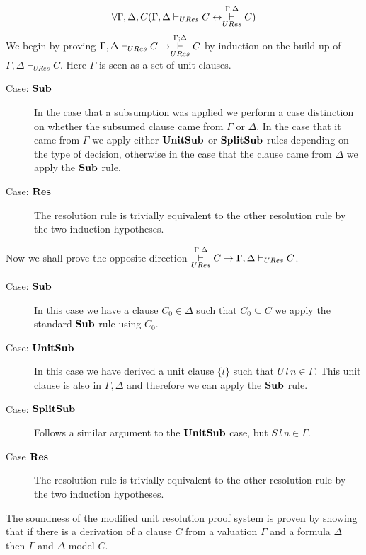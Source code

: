 \medskip
\begin{mytheorem}
\begin{align*}
\forall \Gamma,\Delta,C ( \Gamma,\Delta \vdash_{URes} C  \leftrightarrow   \overset{\Gamma;\Delta}{\underset{URes}{\vdash}} C )
\end{align*}
 We begin by proving $\Gamma,\Delta \vdash_{URes} C  \to   \overset{\Gamma;\Delta}{\underset{URes}{\vdash}} C$ by induction on the build up of $\Gamma, \Delta \vdash_{URes} C$. Here $\Gamma$ is seen as a set of unit clauses.
\begin{description}

\item[Case: $\mathbf{Sub}$]
In the case that a subsumption was applied we perform a case distinction on whether the subsumed clause came from $\Gamma$ or $\Delta$. In the case that it came from $\Gamma$ we apply either $\mathbf{UnitSub}$ or $\mathbf{SplitSub}$ rules depending on the type of decision, otherwise in the case that the clause came from $\Delta$ we apply the $\mathbf{Sub}$ rule.
\item[Case: $\mathbf{Res}$]
The resolution rule is trivially equivalent to the other resolution rule by the two induction hypotheses.
\end{description}
Now we shall prove the opposite direction   $\overset{\Gamma;\Delta}{\underset{URes}{\vdash}} C \to \Gamma,\Delta \vdash_{URes} C $.
\begin{description}
\item[Case: $\mathbf{Sub}$]
In this case we have a clause $C_0 \in \Delta$ such that $C_0 \subseteq C$ we apply the standard $\mathbf{Sub}$ rule using $C_0$.
\item[Case: $\mathbf{UnitSub}$]
In this case we have derived a unit clause $\{ l \}$ such that $U \, l \, n \in \Gamma$. This unit clause is also in $\Gamma,\Delta$ and therefore we can apply the  $\mathbf{Sub}$ rule.
\item[Case: $\mathbf{SplitSub}$] 
Follows a similar argument to the $\mathbf{UnitSub}$ case, but $S \, l \, n \in \Gamma$.
\item[Case $\mathbf{Res}$]
The resolution rule is trivially equivalent to the other resolution rule by the two induction hypotheses.
\end{description}

\end{mytheorem}
\medskip
The soundness of the modified unit resolution proof system is proven by showing that if there is a derivation of a clause $C$ from a valuation $\Gamma$ and a formula $\Delta$ then $\Gamma$ and $\Delta$ model $C$. \\
